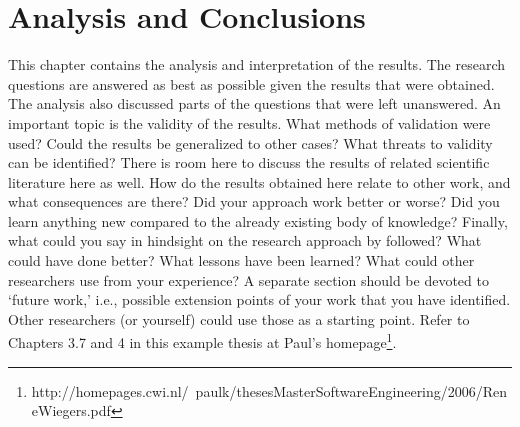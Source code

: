 \chapter{Analysis and Conclusions}
\label{analysis}

This chapter contains the analysis and interpretation of the results. The
research questions are answered as best as possible given the results that were
obtained. The analysis also discussed parts of the questions that were left
unanswered.
An important topic is the validity of the results. What methods of validation
were used? Could the results be generalized to other cases? What threats to
validity can be identified? There is room here to discuss the results of
related scientific literature here as well. How do the results obtained here
relate to other work, and what consequences are there? Did your approach work
better or worse? Did you learn anything new compared to the already existing
body of knowledge? Finally, what could you say in hindsight on the research
approach by followed? What could have done better? What lessons have been
learned? What could other researchers use from your experience? A separate
section should be devoted to ‘future work,’ i.e., possible extension points of
your work that you have identified. Other researchers (or yourself) could use
those as a starting point.
Refer to Chapters 3.7 and 4 in this example thesis at Paul’s
homepage\footnote{http://homepages.cwi.nl/~paulk/thesesMasterSoftwareEngineering/2006/ReneWiegers.pdf}.
